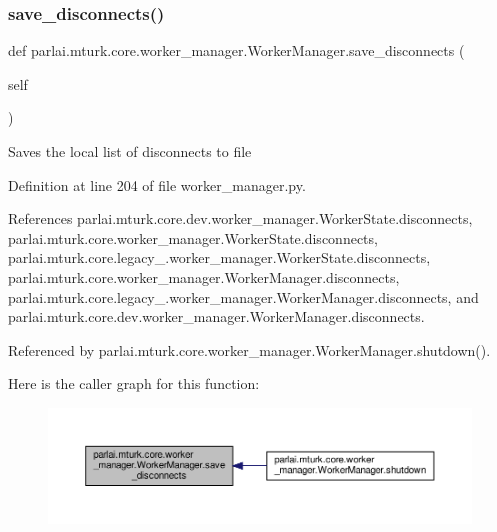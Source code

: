 \subsubsection{\texorpdfstring{save\+\_\+disconnects()}{save\_disconnects()}}
{\footnotesize\ttfamily def parlai.\+mturk.\+core.\+worker\+\_\+manager.\+Worker\+Manager.\+save\+\_\+disconnects (\begin{DoxyParamCaption}\item[{}]{self }\end{DoxyParamCaption})}

\begin{DoxyVerb}Saves the local list of disconnects to file\end{DoxyVerb}
 

Definition at line 204 of file worker\+\_\+manager.\+py.



References parlai.\+mturk.\+core.\+dev.\+worker\+\_\+manager.\+Worker\+State.\+disconnects, parlai.\+mturk.\+core.\+worker\+\_\+manager.\+Worker\+State.\+disconnects, parlai.\+mturk.\+core.\+legacy\+\_.\+worker\+\_\+manager.\+Worker\+State.\+disconnects, parlai.\+mturk.\+core.\+worker\+\_\+manager.\+Worker\+Manager.\+disconnects, parlai.\+mturk.\+core.\+legacy\+\_.\+worker\+\_\+manager.\+Worker\+Manager.\+disconnects, and parlai.\+mturk.\+core.\+dev.\+worker\+\_\+manager.\+Worker\+Manager.\+disconnects.



Referenced by parlai.\+mturk.\+core.\+worker\+\_\+manager.\+Worker\+Manager.\+shutdown().

Here is the caller graph for this function\+:
\nopagebreak
\begin{figure}[H]
\begin{center}
\leavevmode
\includegraphics[width=350pt]{classparlai_1_1mturk_1_1core_1_1worker__manager_1_1WorkerManager_ad5ea6d1d764743de25c71d027d6f981c_icgraph}
\end{center}
\end{figure}
\mbox{\label{classparlai_1_1mturk_1_1core_1_1worker__manager_1_1WorkerManager_a814ac330b709eeef4abf4e4a73d71447}} 
